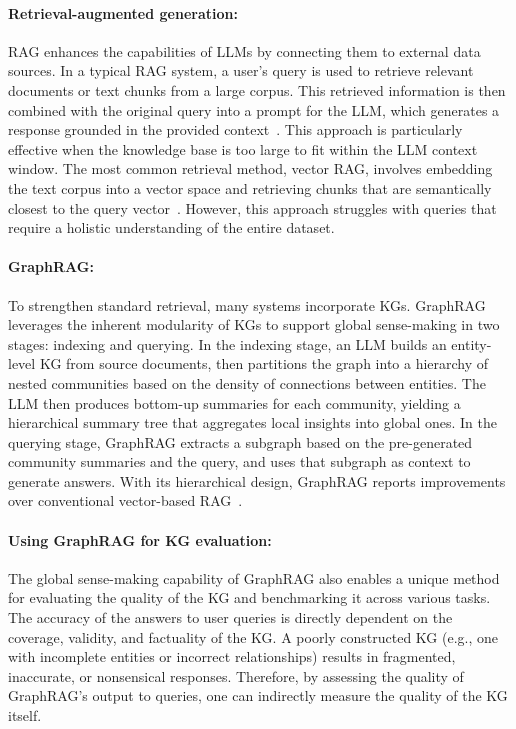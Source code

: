 \documentclass[10pt]{article}
\begin{document}
\paragraph{Retrieval-augmented generation:}
RAG enhances the capabilities of LLMs by connecting them to external data sources. In a typical RAG system, a user's query is used to retrieve relevant documents or text chunks from a large corpus. This retrieved information is then combined with the original query into a prompt for the LLM, which generates a response grounded in the provided context~\cite{ram2023context}. This approach is particularly effective when the knowledge base is too large to fit within the LLM context window. The most common retrieval method, vector RAG, involves embedding the text corpus into a vector space and retrieving chunks that are semantically closest to the query vector~\cite{gao2023retrieval}. However, this approach struggles with queries that require a holistic understanding of the entire dataset.

\paragraph{GraphRAG:}
To strengthen standard retrieval, many systems incorporate KGs. GraphRAG \cite{edge2024localglobalgraphrag} leverages the inherent modularity of KGs to support global sense-making in two stages: indexing and querying. In the indexing stage, an LLM builds an entity-level KG from source documents, then partitions the graph into a hierarchy of nested communities based on the density of connections between entities. The LLM then produces bottom-up summaries for each community, yielding a hierarchical summary tree that aggregates local insights into global ones. In the querying stage, GraphRAG extracts a subgraph based on the pre-generated community summaries and the query, and uses that subgraph as context to generate answers. With its hierarchical design, GraphRAG reports improvements over conventional vector-based RAG~\cite{edge2024localglobalgraphrag}.

\paragraph{Using GraphRAG for KG evaluation:}
The global sense-making capability of GraphRAG also enables a unique method for evaluating the quality of the KG and benchmarking it across various tasks. The accuracy of the answers to user queries is directly dependent on the coverage, validity, and factuality of the KG. A poorly constructed KG (e.g., one with incomplete entities or incorrect relationships) results in fragmented, inaccurate, or nonsensical responses. Therefore, by assessing the quality of GraphRAG's output to queries, one can indirectly measure the quality of the KG itself.
\end{document}
